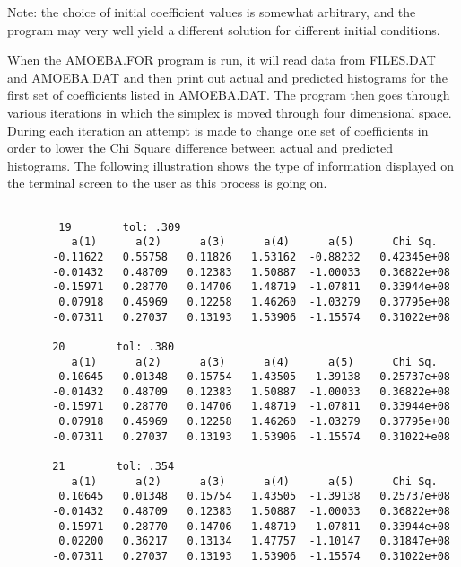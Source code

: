       Note:  the choice of initial coefficient values is somewhat
          arbitrary, and the program may very well yield a different
          solution for different initial conditions.
   
      When the AMOEBA.FOR program is run, it will read data from FILES.DAT
   and AMOEBA.DAT and then print out actual and predicted histograms for
   the first set of coefficients listed in AMOEBA.DAT.  The program then
   goes through various iterations in which the simplex is moved through
   four dimensional space.  During each iteration an attempt is made to
   change one set of coefficients in order to lower the Chi Square
   difference between actual and predicted histograms.  The following
   illustration shows the type of information displayed on the terminal
   screen to the user as this process is going on.
\begin{center}
\begin{verbatim}   
     
        19        tol: .309                                           
          a(1)      a(2)      a(3)      a(4)      a(5)      Chi Sq.   
       -0.11622   0.55758   0.11826   1.53162  -0.88232   0.42345e+08 
       -0.01432   0.48709   0.12383   1.50887  -1.00033   0.36822e+08 
       -0.15971   0.28770   0.14706   1.48719  -1.07811   0.33944e+08 
        0.07918   0.45969   0.12258   1.46260  -1.03279   0.37795e+08 
       -0.07311   0.27037   0.13193   1.53906  -1.15574   0.31022e+08 
                                                                      
       20        tol: .380                                            
          a(1)      a(2)      a(3)      a(4)      a(5)      Chi Sq.   
       -0.10645   0.01348   0.15754   1.43505  -1.39138   0.25737e+08 
       -0.01432   0.48709   0.12383   1.50887  -1.00033   0.36822e+08 
       -0.15971   0.28770   0.14706   1.48719  -1.07811   0.33944e+08 
        0.07918   0.45969   0.12258   1.46260  -1.03279   0.37795e+08 
       -0.07311   0.27037   0.13193   1.53906  -1.15574   0.31022+e08 
                                                                      
       21        tol: .354                                            
          a(1)      a(2)      a(3)      a(4)      a(5)      Chi Sq.   
        0.10645   0.01348   0.15754   1.43505  -1.39138   0.25737e+08 
       -0.01432   0.48709   0.12383   1.50887  -1.00033   0.36822e+08 
       -0.15971   0.28770   0.14706   1.48719  -1.07811   0.33944e+08 
        0.02200   0.36217   0.13134   1.47757  -1.10147   0.31847e+08 
       -0.07311   0.27037   0.13193   1.53906  -1.15574   0.31022e+08 
                                                                      
\end{verbatim}
\end{center}                                                                      
                                                                      
